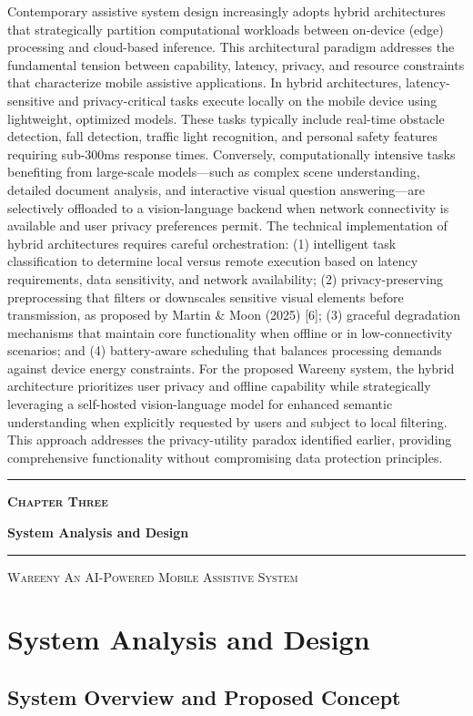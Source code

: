 \documentclass[a4paper]{report}
\newcommand{\chaptercover}[3]{%
  \clearpage
  \thispagestyle{empty}
  \begin{center}
  \vspace*{\fill}
    \makebox[0pt]{\raisebox{-0.30\height}{\textcolor{coverghost}{\fontsize{190}{190}\selectfont\bfseries #1}}}\par
    \vspace{1.9cm}
    {\color{coveraccent}\rule{0.16\textwidth}{3pt}}\par
    \vspace{0.5cm}
    {\Large\bfseries\scshape\color{coveraccent} #2\par}
    \vspace{0.6cm}
    {\fontsize{32}{37}\selectfont\bfseries\color{coverink} #3\par}
    \vspace{0.8cm}
    {\color{coverink!35}\rule{0.55\textwidth}{0.6pt}}\par
  \vspace*{\fill}
    {\footnotesize\scshape\color{coverink!55} Wareeny \quad\textbullet\quad An AI-Powered Mobile Assistive System\par}
    \vspace{0.8cm}
  \end{center}
  \clearpage
}
\begin{document}
Contemporary assistive system design increasingly adopts hybrid architectures that strategically partition computational workloads between on-device (edge) processing and cloud-based inference. This architectural paradigm addresses the fundamental tension between capability, latency, privacy, and resource constraints that characterize mobile assistive applications. In hybrid architectures, latency-sensitive and privacy-critical tasks execute locally on the mobile device using lightweight, optimized models. These tasks typically include real-time obstacle detection, fall detection, traffic light recognition, and personal safety features requiring sub-300ms response times. Conversely, computationally intensive tasks benefiting from large-scale models---such as complex scene understanding, detailed document analysis, and interactive visual question answering---are selectively offloaded to a vision-language backend when network connectivity is available and user privacy preferences permit. The technical implementation of hybrid architectures requires careful orchestration: (1) intelligent task classification to determine local versus remote execution based on latency requirements, data sensitivity, and network availability; (2) privacy-preserving preprocessing that filters or downscales sensitive visual elements before transmission, as proposed by Martin \& Moon (2025) [6]; (3) graceful degradation mechanisms that maintain core functionality when offline or in low-connectivity scenarios; and (4) battery-aware scheduling that balances processing demands against device energy constraints. For the proposed Wareeny system, the hybrid architecture prioritizes user privacy and offline capability while strategically leveraging a self-hosted vision-language model for enhanced semantic understanding when explicitly requested by users and subject to local filtering. This approach addresses the privacy-utility paradox identified earlier, providing comprehensive functionality without compromising data protection principles.


\chaptercover{3}{Chapter Three}{System Analysis and Design}
\chapter{System Analysis and Design}

\section{System Overview and Proposed Concept}
\end{document}

